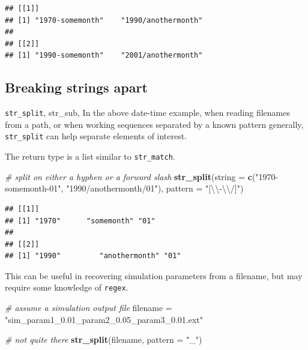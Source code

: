 \documentclass[]{book}
\newenvironment{Shaded}{}{}
\newcommand{\CharTok}[1]{\textcolor[rgb]{0.25,0.44,0.63}{#1}}
\newcommand{\CommentTok}[1]{\textcolor[rgb]{0.38,0.63,0.69}{\textit{#1}}}
\newcommand{\DataTypeTok}[1]{\textcolor[rgb]{0.56,0.13,0.00}{#1}}
\newcommand{\KeywordTok}[1]{\textcolor[rgb]{0.00,0.44,0.13}{\textbf{#1}}}
\newcommand{\NormalTok}[1]{#1}
\newcommand{\StringTok}[1]{\textcolor[rgb]{0.25,0.44,0.63}{#1}}
\begin{document}
\begin{verbatim}
## [[1]]
## [1] "1970-somemonth"    "1990/anothermonth"
## 
## [[2]]
## [1] "1990-somemonth"    "2001/anothermonth"
\end{verbatim}

\hypertarget{breaking-strings-apart}{%
\subsection{Breaking strings apart}\label{breaking-strings-apart}}

\texttt{str\_split}, str\_sub,
In the above date-time example, when reading filenames from a path, or when working sequences separated by a known pattern generally, \texttt{str\_split} can help separate elements of interest.

The return type is a list similar to \texttt{str\_match}.

\begin{Shaded}
\begin{Highlighting}[]
\CommentTok{# split on either a hyphen or a forward slash}
\KeywordTok{str_split}\NormalTok{(}\DataTypeTok{string =} \KeywordTok{c}\NormalTok{(}\StringTok{"1970-somemonth-01"}\NormalTok{,}
                     \StringTok{"1990/anothermonth/01"}\NormalTok{),}
          \DataTypeTok{pattern =} \StringTok{"[}\CharTok{\textbackslash{}\textbackslash{}}\StringTok{-}\CharTok{\textbackslash{}\textbackslash{}}\StringTok{/]"}\NormalTok{)}
\end{Highlighting}
\end{Shaded}

\begin{verbatim}
## [[1]]
## [1] "1970"      "somemonth" "01"       
## 
## [[2]]
## [1] "1990"         "anothermonth" "01"
\end{verbatim}

This can be useful in recovering simulation parameters from a filename, but may require some knowledge of \texttt{regex}.

\begin{Shaded}
\begin{Highlighting}[]
\CommentTok{# assume a simulation output file}
\NormalTok{filename =}\StringTok{ "sim_param1_0.01_param2_0.05_param3_0.01.ext"}

\CommentTok{# not quite there}
\KeywordTok{str_split}\NormalTok{(filename, }\DataTypeTok{pattern =} \StringTok{"_"}\NormalTok{)}
\end{Highlighting}
\end{Shaded}
\end{document}
